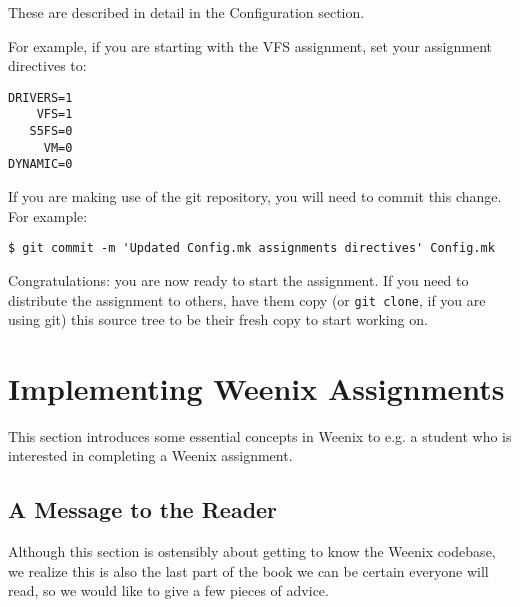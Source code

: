 \begin{enumerate}
These are described in detail in the Configuration section.

For example, if you are starting with the VFS assignment, set your assignment directives to:

\begin{verbatim}
DRIVERS=1
    VFS=1
   S5FS=0
     VM=0
DYNAMIC=0\end{verbatim}

If you are making use of the git repository, you will need to commit this change.  For example:

\begin{verbatim}
$ git commit -m 'Updated Config.mk assignments directives' Config.mk\end{verbatim}

\end{enumerate}

Congratulations: you are now ready to start the assignment.  If you need to distribute the assignment to others, have them copy (or \texttt{git clone}, if you are using git) this source tree to be their fresh copy to start working on.

\section{Implementing Weenix Assignments}

This section introduces some essential concepts in Weenix to e.g. a student who is interested in completing a Weenix assignment.

\subsection{A Message to the Reader}
Although this section is ostensibly about getting to know the Weenix codebase, we realize this is also the last part of the book we can be certain everyone will read, so we would like to give a few pieces of advice.

